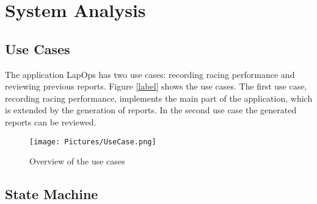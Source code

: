 \chapter{System Analysis}

\section{Use Cases}
The application LapOps has two use cases: recording racing performance and reviewing previous reports. Figure \ref{label} shows the use cases. The first use case, recording racing performance, implements the main part of the application, which is extended by the generation of reports. In the second use case the generated reports can be reviewed. 

\begin{figure}[H]
	\centering
	\texttt{[image: Pictures/UseCase.png]}
	\caption{Overview of the use cases}
	\label{fig:sgoriFor}
\end{figure}

\section{State Machine}
